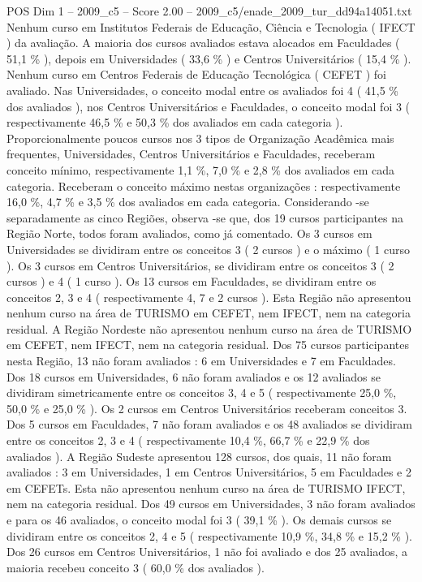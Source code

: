 \begin{textsample}{POS Dim 1 – 2009\_c5 – Score 2.00 – 2009\_c5/enade\_2009\_tur\_dd94a14051.txt}
Nenhum curso em Institutos Federais de Educação, Ciência e Tecnologia ( IFECT ) da avaliação.
A maioria dos cursos avaliados estava alocados em Faculdades ( 51,1 \% ), depois em Universidades ( 33,6 \% ) e Centros Universitários ( 15,4 \% ).
Nenhum curso em Centros Federais de Educação Tecnológica ( CEFET ) foi avaliado.
Nas Universidades, o conceito modal entre os avaliados foi 4 ( 41,5 \% dos avaliados ), nos Centros Universitários e Faculdades, o conceito modal foi 3 ( respectivamente 46,5 \% e 50,3 \% dos avaliados em cada categoria ).
Proporcionalmente poucos cursos nos 3 tipos de Organização Acadêmica mais frequentes, Universidades, Centros Universitários e Faculdades, receberam conceito mínimo, respectivamente 1,1 \%, 7,0 \% e 2,8 \% dos avaliados em cada categoria.
Receberam o conceito máximo nestas organizações : respectivamente 16,0 \%, 4,7 \% e 3,5 \% dos avaliados em cada categoria.
Considerando -se separadamente as cinco Regiões, observa -se que, dos 19 cursos participantes na Região Norte, todos foram avaliados, como já comentado.
Os 3 cursos em Universidades se dividiram entre os conceitos 3 ( 2 cursos ) e o máximo ( 1 curso ).
Os 3 cursos em Centros Universitários, se dividiram entre os conceitos 3 ( 2 cursos ) e 4 ( 1 curso ).
Os 13 cursos em Faculdades, se dividiram entre os conceitos 2, 3 e 4 ( respectivamente 4, 7 e 2 cursos ).
Esta Região não apresentou nenhum curso na área de TURISMO em CEFET, nem IFECT, nem na categoria residual.
A Região Nordeste não apresentou nenhum curso na área de TURISMO em CEFET, nem IFECT, nem na categoria residual.
Dos 75 cursos participantes nesta Região, 13 não foram avaliados : 6 em Universidades e 7 em Faculdades.
Dos 18 cursos em Universidades, 6 não foram avaliados e os 12 avaliados se dividiram simetricamente entre os conceitos 3, 4 e 5 ( respectivamente 25,0 \%, 50,0 \% e 25,0 \% ).
Os 2 cursos em Centros Universitários receberam conceitos 3.
Dos 5 cursos em Faculdades, 7 não foram avaliados e os 48 avaliados se dividiram entre os conceitos 2, 3 e 4 ( respectivamente 10,4 \%, 66,7 \% e 22,9 \% dos avaliados ).
A Região Sudeste apresentou 128 cursos, dos quais, 11 não foram avaliados : 3 em Universidades, 1 em Centros Universitários, 5 em Faculdades e 2 em CEFETs.
Esta não apresentou nenhum curso na área de TURISMO IFECT, nem na categoria residual.
Dos 49 cursos em Universidades, 3 não foram avaliados e para os 46 avaliados, o conceito modal foi 3 ( 39,1 \% ).
Os demais cursos se dividiram entre os conceitos 2, 4 e 5 ( respectivamente 10,9 \%, 34,8 \% e 15,2 \% ).
Dos 26 cursos em Centros Universitários, 1 não foi avaliado e dos 25 avaliados, a maioria recebeu conceito 3 ( 60,0 \% dos avaliados ).

\end{textsample}
